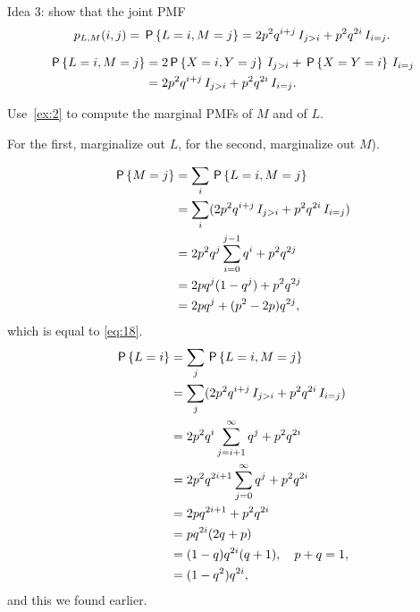 \documentclass[a4paper,12pt]{article}
\begin{document}
\begin{exercise}\label{ex:2}
Idea 3: show that  the  joint PMF
\begin{equation}
p_{L,M}(i,j) = \,\mathsf{P}\left\{L=i, M=j\right\} = 2p^{2}q^{i+j}\,I_{j>i}+ p^{2}q^{2i}\,I_{i=j}.
\end{equation}
\begin{solution}
  \begin{align}
    \label{eq:17}
\,\mathsf{P}\left\{L=i, M=j\right\}    
&= 2\,\mathsf{P}\left\{X=i, Y=j\right\}\,I_{j>i} + \,\mathsf{P}\left\{X=Y=i\right\}\,I_{i=j} \\
&= 2p^{2}q^{i+j}\,I_{j>i}+ p^{2}q^{2i}\,I_{i=j}.
  \end{align}
\end{solution}
\end{exercise}

\begin{exercise}\label{ex:8}
Use~\cref{ex:2} to compute the marginal PMFs of $M$ and of $L$. 
\begin{hint}
For the first, marginalize out $L$, for the second, marginalize out $M$).
\end{hint}
\begin{solution}
  \begin{align}
\,\mathsf{P}\left\{M=j\right\}    
&= \sum_{i} \,\mathsf{P}\left\{L=i, M=j\right\} \\
 &= \sum_{i} (2p^{2}q^{i+j}\,I_{j>i}+ p^{2}q^{2i}\,I_{i=j}) \\
 &= 2p^2q^j\sum_{i=0}^{j-1} q^{i}+ p^{2}q^{2j} \label{eq:38}\\
 &= 2pq^j (1-q^{j})+ p^{2}q^{2j} \\
 &= 2pq^j + (p^{2}-2p) q^{2j},
  \end{align}
which is equal to \cref{eq:18}.
  \begin{align}
\,\mathsf{P}\left\{L=i\right\}    
&= \sum_{j} \,\mathsf{P}\left\{L=i, M=j\right\} \\
 &= \sum_{j} (2p^{2}q^{i+j}\,I_{j>i}+ p^{2}q^{2i}\,I_{i=j}) \\
 &= 2p^2q^i\sum_{j=i+1}^{\infty} q^{j}+ p^{2}q^{2i} \\
 &= 2p^{2}q^{2i+1} \sum_{j=0}^{\infty}q^{j}+ p^{2}q^{2i} \\
 &= 2pq^{2i+1} + p^{2} q^{2i}\\
 &= pq^{2i}(2q+p)\\
 &= (1-q)q^{2i}(q + 1), \quad p+q=1,\\
 &= (1-q^{2})q^{2i},
  \end{align}
and this we found earlier.
\end{solution}
\end{exercise}
\end{document}

